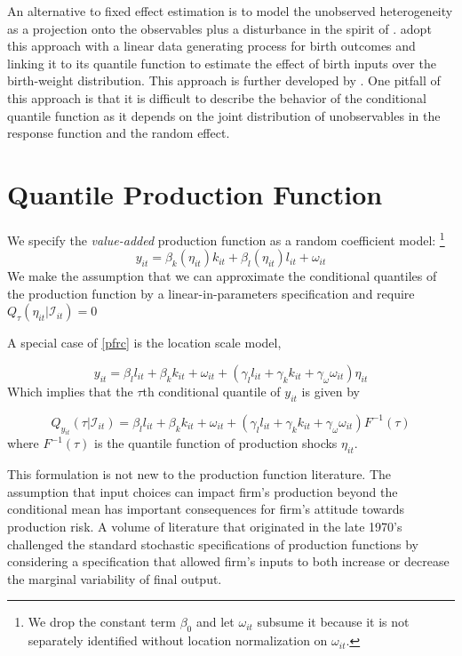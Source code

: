 \documentclass[11pt]{article}
\begin{document}
An alternative to fixed effect estimation is to model the unobserved heterogeneity as a projection onto the observables plus a disturbance in the spirit of \cite{Chamberlain1984}. \cite{Abrevaya2008} adopt this approach with a linear data generating process for birth outcomes and linking it to its quantile function to estimate the effect of birth inputs over the birth-weight distribution. This approach is further developed by \cite*{Bache2012}. One pitfall of this approach is that it is difficult to describe the behavior of the conditional quantile function as it depends on the joint distribution of unobservables in the response function and the random effect.


\section{Quantile Production Function\label{sec:OP-and-LP}}
We specify the \textit{value-added} production function as a random coefficient model:
\footnote{We drop the constant term $\beta_{0}$ and let $\omega_{it}$
subsume it because it is not separately identified without location
normalization on $\omega_{it}$.}
\begin{equation} \label{pfrc}
    y_{it}=\beta_{k}(\eta_{it})k_{it}+\beta_{l}(\eta_{it})l_{it}+\omega_{it}
\end{equation}
We make the assumption that we can approximate the conditional quantiles of the production function by a linear-in-parameters specification and require $Q_{\tau}(\eta_{it}|\mathcal{I}_{it})=0$

A special case of \eqref{pfrc} is the location scale model,

\begin{equation}
    y_{it}=\beta_{l}l_{it}+\beta_{k}k_{it}+\omega_{it}+(\gamma_{l}l_{it}+\gamma_{k}k_{it}+\gamma_{\omega}\omega_{it})\eta_{it}
\end{equation}
Which implies that the $\tau$th conditional quantile of $y_{it}$ is given by

\begin{equation}
Q_{y_{it}}(\tau|\mathcal{I}_{it})=\beta_{l}l_{it}+\beta_{k}k_{it}+\omega_{it}+(\gamma_{l}l_{it}+\gamma_{k}k_{it}+\gamma_{\omega}\omega_{it})F^{-1}(\tau)
\end{equation}
where $F^{-1}(\tau)$ is the quantile function of production shocks $\eta_{it}$.

This formulation is not new to the production function literature. The assumption that input choices can impact firm's production beyond the conditional mean has important consequences for firm's attitude towards production risk. A volume of literature that originated in the late 1970's challenged the standard stochastic specifications of production functions \citep{Just1978,Just1979} by considering a specification that allowed firm's inputs to both increase or decrease the marginal variability of final output.
\end{document}
